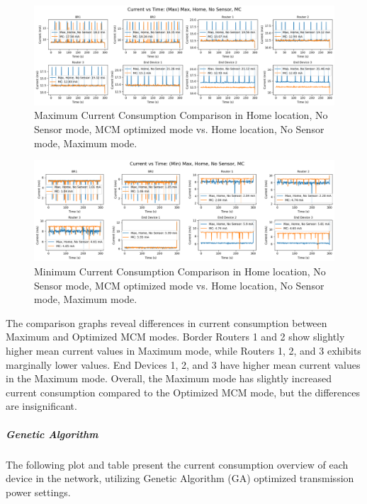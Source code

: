 \begin{figure}[H]
  \centering
  \includegraphics[width=1\textwidth]{images/research_results/current_consumption_analysis/optimized/home/no_sensor/mc/comparison/max_comparison_home_no_sensor_mc_vs_home_no_sensor_max.png}
    \caption{Maximum Current Consumption Comparison in Home location, No Sensor mode, MCM optimized mode vs. Home location, No Sensor mode, Maximum mode.}
    \label{fig:max_comparison_home_no_sensor_mc_vs_home_no_sensor_max}
\end{figure}

\begin{figure}[H]
  \centering
  \includegraphics[width=1\textwidth]{images/research_results/current_consumption_analysis/optimized/home/no_sensor/mc/comparison/min_comparison_home_no_sensor_mc_vs_home_no_sensor_max.png}
    \caption{Minimum Current Consumption Comparison in Home location, No Sensor mode, MCM optimized mode vs. Home location, No Sensor mode, Maximum mode.}
    \label{fig:min_comparison_home_no_sensor_mc_vs_home_no_sensor_max}
\end{figure}

The comparison graphs reveal differences in current consumption between Maximum and Optimized MCM modes. Border Routers 1 and 2 show slightly higher mean current values in Maximum mode, while Routers 1, 2, and 3 exhibits marginally lower values. End Devices 1, 2, and 3 have higher mean current values in the Maximum mode. Overall, the Maximum mode has slightly increased current consumption compared to the Optimized MCM mode, but the differences are insignificant.

\subparagraph{Genetic Algorithm}
The following plot and table present the current consumption overview of each device in the network, utilizing Genetic Algorithm (GA) optimized transmission power settings.

